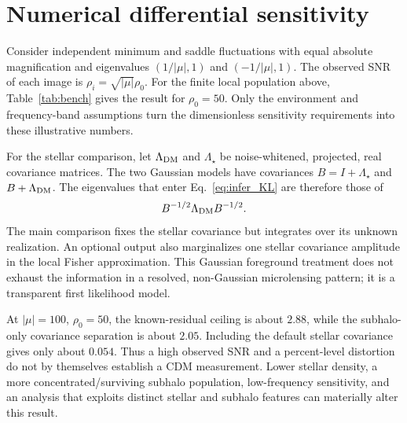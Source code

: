 \documentclass[11pt]{article}
\begin{document}
\section{Numerical differential sensitivity}

Consider independent minimum and saddle fluctuations with equal absolute
magnification and eigenvalues $(1/|\mu|,1)$ and $(-1/|\mu|,1)$.
The observed SNR of each image is $\rho_i=\sqrt{|\mu|}\rho_0$.
For the finite local population above, Table~\ref{tab:bench} gives the result
for $\rho_0=50$. Only the environment and frequency-band assumptions turn the
dimensionless sensitivity requirements into these illustrative numbers.

\begin{table}[htbp]
\centering\small

\caption{Default $10$--$100$ Hz local benchmark. The residual SNR is an
RMS \emph{known-realization ceiling}. The last column is
$d=\sqrt{2D_{\rm KL}}$ for adding subhalos on top of a fixed stellar covariance,
after marginalizing both random fields. Neither column is a calibrated
Gaussian discovery significance. The $|\mu|=100$ stellar calculation is
close to the weak-screen warning regime.}
\label{tab:bench}
\end{table}

For the stellar comparison, let $\Lambda_{\rm DM}$ and $\Lambda_\star$ be
noise-whitened, projected, real covariance matrices. The two Gaussian models
have covariances $B=I+\Lambda_\star$ and $B+\Lambda_{\rm DM}$.
The eigenvalues that enter Eq.~\eqref{eq:infer_KL} are therefore those of
\begin{equation}
 B^{-1/2}\Lambda_{\rm DM}B^{-1/2}.
\end{equation}
The main comparison fixes the stellar covariance but integrates over its
unknown realization. An optional output also marginalizes one stellar
covariance amplitude in the local Fisher approximation. This Gaussian
foreground treatment does not exhaust the information in a resolved,
non-Gaussian microlensing pattern; it is a transparent first likelihood model.

At $|\mu|=100$, $\rho_0=50$, the known-residual ceiling is about $2.88$, while
the subhalo-only covariance separation is about $2.05$. Including the default
stellar covariance gives only about $0.054$. Thus a high observed SNR and a
percent-level distortion do not by themselves establish a CDM measurement.
Lower stellar density, a more concentrated/surviving subhalo population,
low-frequency sensitivity, and an analysis that exploits distinct stellar and
subhalo features can materially alter this result.
\end{document}
